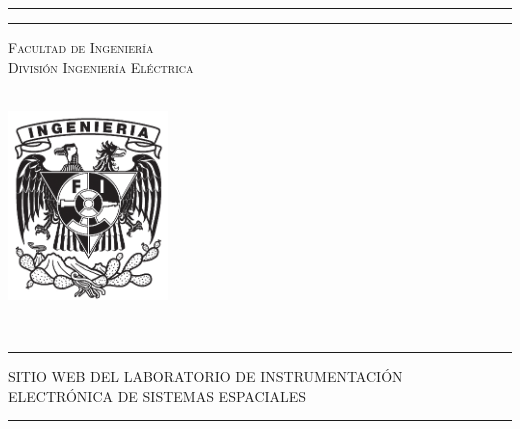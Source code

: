 \begin{titlepage}
\begin{minipage}[c][0.195\textheight][t]{0.75\textwidth}
\begin{center}
                    {\color{black}\hrule height2pt}
                    \vspace{.2cm}
                           {\color{black}\hrule height1pt}
                           \vspace{1.5cm}
                           \textsc{\LARGE Facultad de Ingeniería\\ División Ingeniería Eléctrica}
    \end{center}
  \end{minipage}
  \begin{minipage}[c][0.81\textheight][t]{0.25\textwidth}
    \vspace*{5mm}
    \begin{center}
      \hskip0.5mm
             \vspace{5mm}
             \hskip2pt
                 {\color{black}\vrule width3pt height13cm}
                 \hskip2mm
                     {\color{black}\vrule width1pt height13cm} \\
                     \vspace{5mm}
                     \hspace*{-15mm}
             \includegraphics[height=5cm]{Imagenes/escudofi_negro.jpg}
    \end{center}
  \end{minipage}
  \begin{minipage}[c][0.81\textheight][t]{0.75\textwidth}
    \begin{center}
      \vspace{2cm}

      {\color{black}{\LARGE \scshape Laboratorio de Instrumentación Electrónica de Sistemas Espaciales}\\[.2in]
      \vspace{4 cm}            
{\color{black}\hrule height1pt}
\vspace{0.25 cm}  
\begin{center}
\LARGE \scshape SITIO WEB DEL LABORATORIO DE INSTRUMENTACIÓN ELECTRÓNICA DE SISTEMAS ESPACIALES
\vspace{0.25 cm}  
{\color{black}\hrule height1pt}
\vspace{3 cm}
\end{center}

 }

    \end{center}
  \end{minipage}
\end{titlepage}
